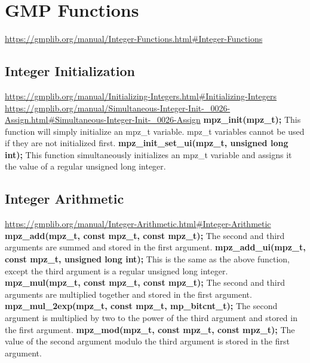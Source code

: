 \section{GMP Functions}


\url{https://gmplib.org/manual/Integer-Functions.html#Integer-Functions}


\subsection{Integer Initialization}

\url{https://gmplib.org/manual/Initializing-Integers.html#Initializing-Integers}
\url{https://gmplib.org/manual/Simultaneous-Integer-Init-_0026-Assign.html#Simultaneous-Integer-Init-_0026-Assign}
\medskip
\break
\textbf{mpz\_init(mpz\_t);}\break
This function will simply initialize an mpz\_t variable.
mpz\_t variables cannot be used if they are not initialized
first.
\medskip
\break
\textbf{mpz\_init\_set\_ui(mpz\_t, unsigned long int);}\break
This function simultaneously initializes an mpz\_t variable
and assigns it the value of a regular unsigned long integer.


\subsection{Integer Arithmetic}

\url{https://gmplib.org/manual/Integer-Arithmetic.html#Integer-Arithmetic}
\medskip
\break
\textbf{mpz\_add(mpz\_t, const mpz\_t, const mpz\_t);}\break
The second and third arguments are summed and stored in the
first argument.
\medskip
\break
\textbf{mpz\_add\_ui(mpz\_t, const mpz\_t, unsigned long int);}\break
This is the same as the above function, except the third
argument is a regular unsigned long integer.
\medskip
\break
\textbf{mpz\_mul(mpz\_t, const mpz\_t, const mpz\_t);}\break
The second and third arguments are multiplied together and
stored in the first argument.
\medskip
\break
\textbf{mpz\_mul\_2exp(mpz\_t, const mpz\_t, mp\_bitcnt\_t);}\break
The second argument is multiplied by two to the power of
the third argument and stored in the first argument.
\medskip
\break
\textbf{mpz\_mod(mpz\_t, const mpz\_t, const mpz\_t);}\break
The value of the second argument modulo the third argument
is stored in the first argument.

